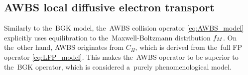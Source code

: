 \subsection{AWBS local diffusive electron transport}
\label{sec:AWBSDiffusiveRegime}
Similarly to the~BGK model, the~AWBS collision operator \ref{eq:AWBS_model} 
explicitly uses equilibration to the~Maxwell-Boltzmann distribution $f_M$. 
On the~other hand, AWBS originates from $C_H$, which is derived from 
the~full FP operator \eqref{eq:LFP_model}. This makes the~AWBS operator 
to be superior to the~BGK operator, which is considered a~purely
phenomenological model.

